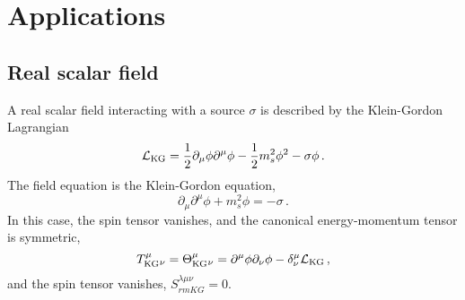 \documentclass[a4paper,12pt]{article}
\def\lag{{\mathcal{L}}}
\begin{document}
\section{Applications}\label{sec:appl}
\subsection{Real scalar field}\label{ssec:scalar}
A real scalar field interacting with a source $\sigma$ is described by the Klein-Gordon Lagrangian
\begin{equation}\label{eq:LagSc}
 \lag_{\rm KG} = \frac{1}{2}\partial_\mu \phi \partial^\mu \phi -\frac{1}{2}m_s^2 \phi^2 -\sigma\phi\,.
\end{equation}
The field equation is the Klein-Gordon equation,
\begin{equation}\label{eq:KGe}
 \partial_\mu \partial^\mu \phi + m_s^2 \phi = -\sigma\,.
\end{equation}
In this case, the spin tensor vanishes, and the canonical energy-momentum tensor is symmetric,
\begin{equation}\label{eq:EMcanSc}
 T^\mu_{\rm KG}{}_\nu = \Theta^\mu_{\rm KG}{}_\nu =\partial^\mu \phi \partial_\nu \phi - \delta^\mu_\nu \lag_{\rm KG}\,,
\end{equation}
and the spin tensor vanishes, $S^{\lambda\mu\nu}_{rm KG} = 0$.
\end{document}

